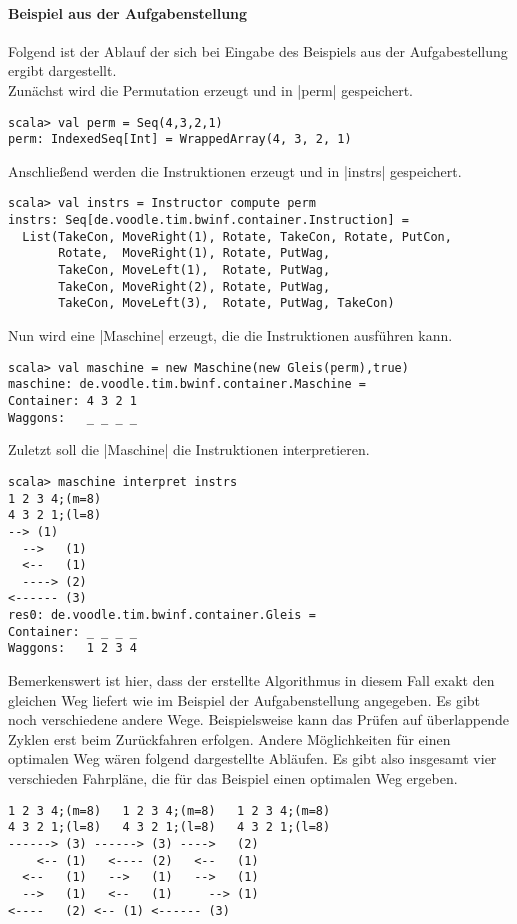 \paragraph{Beispiel aus der Aufgabenstellung}
Folgend ist der Ablauf der sich bei Eingabe des Beispiels aus der Aufgabestellung ergibt dargestellt. \\
Zunächst wird die Permutation erzeugt und in |perm| gespeichert.
\begin{lstlisting}
scala> val perm = Seq(4,3,2,1)               
perm: IndexedSeq[Int] = WrappedArray(4, 3, 2, 1)
\end{lstlisting}
Anschließend werden die Instruktionen erzeugt und in |instrs| gespeichert.
\begin{lstlisting}
scala> val instrs = Instructor compute perm
instrs: Seq[de.voodle.tim.bwinf.container.Instruction] =
  List(TakeCon, MoveRight(1), Rotate, TakeCon, Rotate, PutCon,
       Rotate,  MoveRight(1), Rotate, PutWag,
       TakeCon, MoveLeft(1),  Rotate, PutWag,
       TakeCon, MoveRight(2), Rotate, PutWag,
       TakeCon, MoveLeft(3),  Rotate, PutWag, TakeCon)
\end{lstlisting}
Nun wird eine |Maschine| erzeugt, die die Instruktionen ausführen kann.
\begin{lstlisting}
scala> val maschine = new Maschine(new Gleis(perm),true)
maschine: de.voodle.tim.bwinf.container.Maschine = 
Container: 4 3 2 1
Waggons:   _ _ _ _
\end{lstlisting}
Zuletzt soll die |Maschine| die Instruktionen interpretieren.
\begin{lstlisting}
scala> maschine interpret instrs                        
1 2 3 4;(m=8)
4 3 2 1;(l=8)
-->	(1)
  -->	(1)
  <--	(1)
  ---->	(2)
<------	(3)
res0: de.voodle.tim.bwinf.container.Gleis = 
Container: _ _ _ _
Waggons:   1 2 3 4
\end{lstlisting}
Bemerkenswert ist hier, dass der erstellte Algorithmus in diesem Fall exakt den gleichen Weg liefert wie im Beispiel der Aufgabenstellung angegeben.
Es gibt noch verschiedene andere Wege.
Beispielsweise kann das Prüfen auf überlappende Zyklen erst beim Zurückfahren erfolgen.
Andere Möglichkeiten für einen optimalen Weg wären folgend dargestellte Abläufen.
Es gibt also insgesamt vier verschieden Fahrpläne, die für das Beispiel einen optimalen Weg ergeben.
\begin{lstlisting}                   
1 2 3 4;(m=8)	1 2 3 4;(m=8)	1 2 3 4;(m=8)
4 3 2 1;(l=8)	4 3 2 1;(l=8)	4 3 2 1;(l=8)
------>	(3)	------>	(3)	---->	(2)
    <--	(1)	  <----	(2)	  <--	(1)
  <--	(1)	  -->	(1)	  -->	(1)
  -->	(1)	  <--	(1)	    -->	(1)
<----	(2)	<--	(1)	<------	(3)
\end{lstlisting}
\newpage
